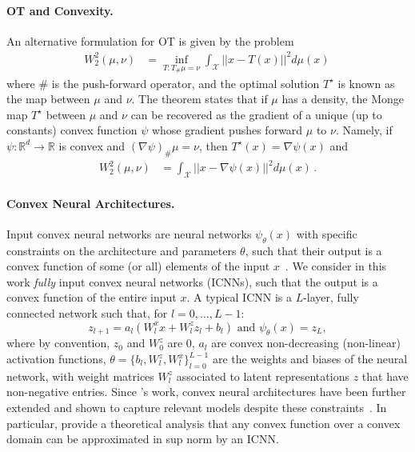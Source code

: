 \paragraph{OT and Convexity.} 
An alternative formulation for OT is given by the \citet{Monge1781} problem  
\begin{align}\label{eq:monge}
W_2^2(\mu,\nu) &= \inf_{T:T_{\#} \mu = \nu} \int_\mathcal{X} ||x - T(x)||^2d\mu(x) \,
\end{align}
where $\#$ is the push-forward operator, and the optimal solution $T^\star$ is known as the \citeauthor{Monge1781} map between $\mu$ and $\nu$. The \citeauthor{Brenier1987} theorem \citeyear{Brenier1987} states that if $\mu$ has a density, the Monge map $T^\star$ between $\mu$ and $\nu$ can be recovered as the gradient of a unique (up to constants) convex function $\psi$ whose gradient pushes forward $\mu$ to $\nu$. Namely, if $\psi:\mathbb{R}^d \rightarrow \mathbb{R}$ is convex and $(\nabla \psi)_{\#}\mu = \nu$, then $T^\star(x)=\nabla \psi(x)$ and
\begin{align}\label{eq:brenier}
W_2^2(\mu,\nu) &= \int_\mathcal{X} ||x - \nabla \psi(x)||^2 d\mu(x)\,.
\end{align}


\paragraph{Convex Neural Architectures.}
Input convex neural networks are neural networks $\psi_\theta(x)$ with specific constraints on the architecture and parameters $\theta$, such that their output is a convex function of some (or all) elements of the input $x$~\citep{amos2017input}. We consider in this work \textit{fully} input convex neural networks (ICNNs), such that the output is a convex function of the entire input $x$. A typical ICNN is a $L$-layer, fully connected network such that, for $l = 0, \dots, L-1$:
\begin{equation} \label{eq:icnn}
    z_{l+1} = a_l(W^x_lx + W^z_l z_l + b_l)  \text{ and } \psi_\theta(x) = z_L,
\end{equation}
where by convention, $z_0$ and $W^z_0$ are $0$, $a_l$ are convex non-decreasing (non-linear) activation functions, $\theta=\{b_l, W^z_l, W^x_l\}_{l=0}^{L-1}$ are the weights and biases of the neural network, with weight matrices $W^z_l$ associated to latent representations $z$ that have non-negative entries. Since \citet{amos2017input}'s work, convex neural architectures have been further extended and shown to capture relevant models despite these constraints~\citep{amos2017input, pmlr-v119-makkuva20a, huang2021convex}. In particular, \citet{chen2018optimal} provide a theoretical analysis that any convex function over a convex domain can be approximated in sup norm by an ICNN.
